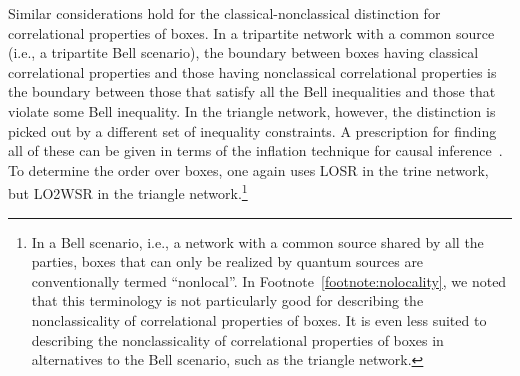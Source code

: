 \documentclass[prx,11pt,letterpaper,twocolumn,accepted=2023-11-27]{quantumarticle}
\theoremstyle{plain}
\theoremstyle{definition}
\begin{document}
\begin{appendices}
Similar considerations hold for the classical-nonclassical distinction for correlational properties of boxes.  In a tripartite network with a common source (i.e., a tripartite Bell scenario), the boundary between boxes having classical correlational properties and those having nonclassical correlational properties is the boundary between those that satisfy all the Bell inequalities and those that violate some Bell inequality.  In the triangle network, however, the distinction is picked out by a different set of inequality constraints.  A prescription for finding all of these 
 can be given in terms of the inflation technique for causal inference~\cite{Wolfe2016inflation,WolfeNavascues}. To determine the order over boxes, 
   one again uses LOSR in the trine network,
    but LO2WSR in the triangle network.\footnote{In a Bell scenario, i.e., a network with a common source shared by all the parties, boxes that can only be realized by quantum sources are conventionally termed ``nonlocal''.  In Footnote~\ref{footnote:nolocality}, we noted that this terminology is not particularly good for describing the nonclassicality of correlational properties of boxes.  It is even less suited to describing the nonclassicality of correlational properties of boxes in alternatives to the Bell scenario, such as the triangle network.  
    } 
    
\end{appendices}
\end{document}
